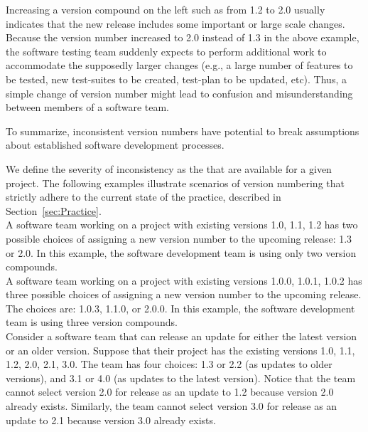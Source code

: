 \documentclass[conference]{IEEEtran}
\begin{document}
Increasing a version compound on the left such as from 1.2 to 2.0 usually indicates that the new release includes some important or large scale changes. Because the version number increased to 2.0 instead of 1.3 in the above example,  the software testing team suddenly expects to perform additional work to accommodate the supposedly larger changes (e.g., a large number of features to be tested, new test-suites to be created, test-plan to be updated, etc).
Thus, a simple change of version number might lead to confusion and misunderstanding between members of a software team.

To summarize, inconsistent version numbers have potential to break assumptions about established software development processes.

We define the severity of inconsistency as the \numberchoices that are available for a 
given project. The following examples illustrate scenarios of version numbering that strictly adhere to the current state of the practice, described in 
Section~\ref{sec:Practice}.\\


 A software team working on a project with existing versions 1.0, 1.1, 1.2 has two possible choices of assigning a new version number to the upcoming release: 1.3 or 2.0. 
In this example, the software development team is using only two version compounds. \\

 A software team working on a project with existing versions 1.0.0, 1.0.1, 1.0.2 has three possible choices of assigning a new version number to the upcoming release. The choices are: 1.0.3, 1.1.0, or 2.0.0. 
In this example, the software development team is using three version compounds. \\


Consider a software team that can release an update for either the latest version or an older version. Suppose that their project has the existing versions 1.0, 1.1, 1.2, 2.0, 2.1, 3.0. The team has four choices: 1.3 or 2.2 (as updates to older versions), and 3.1 or 4.0 (as updates to the latest version). 
Notice that the team cannot select version 2.0 for release as an update to 1.2 
because version 2.0 already exists. 
Similarly, the team cannot select version 3.0 for release as an update to 2.1 because version 3.0 already exists. \\
\end{document}
